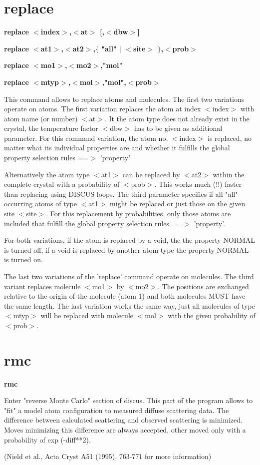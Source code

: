 \section{replace}
{\bf replace $ <$index$> $,$ <$at$> $ [,$ <$dbw$> $] \par }
{\bf replace $ <$at1$> $,$ <$at2$> $,$ \{$ "all" $| $ $ <$site$> $ $\} $,$ <$prob$> $ \par }
{\bf replace $ <$mo1$> $,$ <$mo2$> $,"mol" \par }
{\bf replace $ <$mtyp$> $,$ <$mol$> $,"mol",$ <$prob$> $ \par }
\par
\vspace{3pt}
This command allows to replace atoms and molecules. The first two 
variations operate on atoms. The first variation replaces the 
atom at index $ <$index$> $ with atom name (or number) $ <$at$> $. It the atom 
type does not already exist in the crystal, the temperature factor 
$ <$dbw$> $ has to be given as additional parameter. 
For this command variation, the atom no. $ <$index$> $ is replaced, no 
matter what its individual properties are and whether it fulfills 
the global property selection rules ==$> $ 'property' 
\par
Alternatively the 
atom type $ <$at1$> $ can be replaced by $ <$at2$> $ within the complete crystal 
with a probability of $ <$prob$> $. This works much (!!) faster than 
replacing using DISCUS loops. The third parameter specifies if 
all "all" occurring atoms of type $ <$at1$> $ might be replaced or just 
those on the given site $ <$site$> $. 
For this replacement by probabilities, only those atoms are included 
that fulfill the global property selection rules ==$> $ 'property'. 
\par
For both variations, if the atom is replaced by a void, the 
the property NORMAL is turned off, if a void is replaced by another 
atom type the property NORMAL is turned on. 
\par
The last two variations of the 'replace' command operate on 
molecules. The third variant replaces molecule $ <$mo1$> $ by $ <$mo2$> $. The 
positions are exchanged relative to the origin of the molecule 
(atom 1) and both molecules MUST have the same length. The last 
variation works the same way, just all molecules of type $ <$mtyp$> $ 
will be replaced with molecule $ <$mol$> $ with the given probability 
of $ <$prob$> $. 
\section{rmc}
{\bf rmc \par }
\par
\vspace{3pt}
Enter "reverse Monte Carlo" section of discus. This part of the 
program allows to "fit" a model atom configuration to measured 
diffuse scattering data. The difference between calculated scattering 
and observed scattering is minimized. Moves minimizing this difference 
are always accepted, other moved only with a probability of exp (-diff**2). 
\par
(Nield et al., Acta Cryst A51 (1995), 763-771 for more information) 
\par
